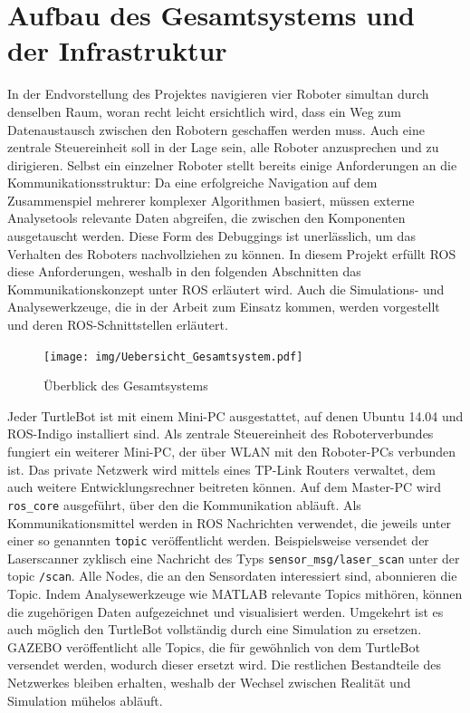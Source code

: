 \chapter{Aufbau des Gesamtsystems und der Infrastruktur}
In der Endvorstellung des Projektes navigieren vier Roboter simultan durch denselben Raum, woran recht leicht ersichtlich wird, dass ein Weg zum Datenaustausch zwischen den Robotern geschaffen werden muss. Auch eine zentrale Steuereinheit soll in der Lage sein, alle Roboter anzusprechen und zu dirigieren. Selbst ein einzelner Roboter stellt bereits einige Anforderungen an die Kommunikationsstruktur: Da eine erfolgreiche Navigation auf dem Zusammenspiel mehrerer komplexer Algorithmen basiert, müssen externe Analysetools relevante Daten abgreifen, die zwischen den Komponenten ausgetauscht werden. Diese Form des Debuggings ist unerlässlich, um das Verhalten des Roboters nachvollziehen zu können. In diesem Projekt erfüllt ROS diese Anforderungen, weshalb in den folgenden Abschnitten das Kommunikationskonzept unter ROS erläutert wird. Auch die Simulations- und Analysewerkzeuge, die in der Arbeit zum Einsatz kommen, werden vorgestellt und deren ROS-Schnittstellen erläutert.

\begin{figure}[!ht]
\centering
\texttt{[image: img/Uebersicht\_Gesamtsystem.pdf]}
\caption{Überblick des Gesamtsystems}
\end{figure}

Jeder TurtleBot ist mit einem Mini-PC ausgestattet, auf denen Ubuntu 14.04 und ROS-Indigo installiert sind. Als zentrale Steuereinheit des Roboterverbundes fungiert ein weiterer Mini-PC, der über WLAN mit den Roboter-PCs verbunden ist. Das private Netzwerk wird mittels eines TP-Link Routers verwaltet, dem auch weitere Entwicklungsrechner beitreten können. Auf dem Master-PC wird \lstinline{ros_core}{} ausgeführt, über den die Kommunikation abläuft. Als Kommunikationsmittel werden in ROS Nachrichten verwendet, die jeweils unter einer so genannten \lstinline{topic}{} veröffentlicht werden. Beispielsweise versendet der Laserscanner zyklisch eine Nachricht des Typs \lstinline{sensor_msg/laser_scan}{} unter der topic \lstinline{/scan}{}. Alle Nodes, die an den Sensordaten interessiert sind, abonnieren die Topic. Indem Analysewerkzeuge wie MATLAB relevante Topics mithören, können die zugehörigen Daten aufgezeichnet und visualisiert werden. Umgekehrt ist es auch möglich den TurtleBot vollständig durch eine Simulation zu ersetzen. GAZEBO veröffentlicht alle Topics, die für gewöhnlich von dem TurtleBot versendet werden, wodurch dieser ersetzt wird. Die restlichen Bestandteile des Netzwerkes bleiben erhalten, weshalb der Wechsel zwischen Realität und Simulation mühelos abläuft.

